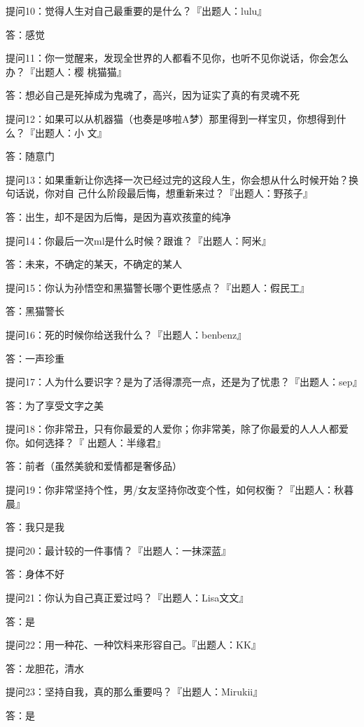 \documentclass[12pt,a4paper]{article}
\def\blankrev{\vspace{1ex}}									%
\begin{document}
		\blankrev
		提问10：觉得人生对自己最重要的是什么？『出题人：lulu』\par
		答：感觉

		\blankrev
		提问11：你一觉醒来，发现全世界的人都看不见你，也听不见你说话，你会怎么办？『出题人：樱
				桃猫猫』\par
		答：想必自己是死掉成为鬼魂了，高兴，因为证实了真的有灵魂不死

		\blankrev
		提问12：如果可以从机器猫（也奏是哆啦A梦）那里得到一样宝贝，你想得到什么？『出题人：小
				文』\par
		答：随意门

		\blankrev
		提问13：如果重新让你选择一次已经过完的这段人生，你会想从什么时候开始？换句话说，你对自
				己什么阶段最后悔，想重新来过？『出题人：野孩子』\par
		答：出生，却不是因为后悔，是因为喜欢孩童的纯净

		\blankrev
		提问14：你最后一次ml是什么时候？跟谁？『出题人：阿米』\par
		答：未来，不确定的某天，不确定的某人

		\blankrev
		提问15：你认为孙悟空和黑猫警长哪个更性感点？『出题人：假民工』\par
		答：黑猫警长

		\blankrev
		提问16：死的时候你给送我什么？『出题人：benbenz』\par
		答：一声珍重

		\blankrev
		提问17：人为什么要识字？是为了活得漂亮一点，还是为了忧患？『出题人：sep』\par
		答：为了享受文字之美

		\blankrev
		提问18：你非常丑，只有你最爱的人爱你；你非常美，除了你最爱的人人人都爱你。如何选择？『
				出题人：半缘君』\par
		答：前者（虽然美貌和爱情都是奢侈品）

		\blankrev
		提问19：你非常坚持个性，男/女友坚持你改变个性，如何权衡？『出题人：秋暮晨』\par
		答：我只是我

		\blankrev
		提问20：最计较的一件事情？『出题人：一抹深蓝』\par
		答：身体不好

		\blankrev
		提问21：你认为自己真正爱过吗？『出题人：Lisa文文』\par
		答：是

		\blankrev
		提问22：用一种花、一种饮料来形容自己。『出题人：KK』\par
		答：龙胆花，清水

		\blankrev
		提问23：坚持自我，真的那么重要吗？『出题人：Mirukii』\par
		答：是
\end{document}
